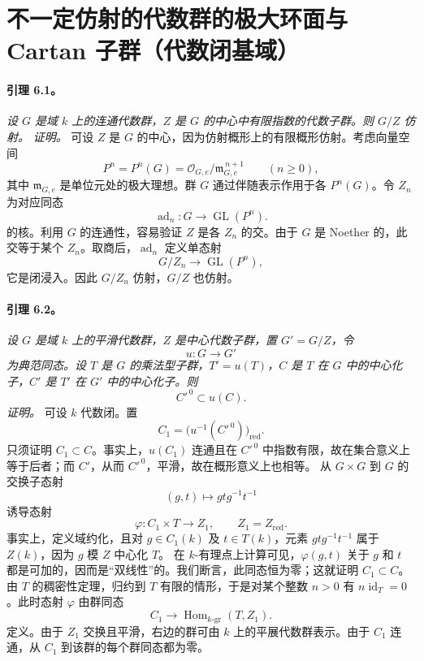 \section[极大环面与 Cartan 子群]
{不一定仿射的代数群的极大环面与 Cartan 子群\textup{（代数闭基域）}}
\paragraph{\textbf{引理 6.1。}}
\emph{设 \(G\) 是域 \(k\) 上的连通代数群，\(Z\) 是 \(G\) 的中心中有限指数的代数子群。则 \(G/Z\) 仿射。}
\emph{证明。}
可设 \(Z\) 是 \(G\) 的中心，因为仿射概形上的有限概形仿射。考虑向量空间
\[
  P^n=P^n(G)=
  \mathcal O_{G,e}/\mathfrak m_{G,e}^{\,n+1}
  \qquad (n\geq 0),
\]
其中 \(\mathfrak m_{G,e}\) 是单位元处的极大理想。群 \(G\) 通过伴随表示作用于各 \(P^n(G)\)。令 \(Z_n\) 为对应同态
\[
  \operatorname{ad}_n:G\longrightarrow \operatorname{GL}(P^n).
\]
的核。利用 \(G\) 的连通性，容易验证 \(Z\) 是各 \(Z_n\) 的交。由于 \(G\) 是 Noether 的，此交等于某个 \(Z_n\)。取商后，\(\operatorname{ad}_n\) 定义单态射
\[
  G/Z_n\longrightarrow \operatorname{GL}(P^n),
\]
它是闭浸入。因此 \(G/Z_n\) 仿射，\(G/Z\) 也仿射。
\paragraph{\textbf{引理 6.2。}}
\emph{设 \(G\) 是域 \(k\) 上的平滑代数群，\(Z\) 是中心代数子群，置 \(G'=G/Z\)，令
\[
  u:G\longrightarrow G'
\]
为典范同态。设 \(T\) 是 \(G\) 的乘法型子群，\(T'=u(T)\)，\(C\) 是 \(T\) 在 \(G\) 中的中心化子，\(C'\) 是 \(T'\) 在 \(G'\) 中的中心化子。则
\[
  C'^{\,0}\subset u(C).
\]
}
\emph{证明。}
可设 \(k\) 代数闭。置
\[
  C_1=\bigl(u^{-1}(C'^{\,0})\bigr)_{\mathrm{red}}.
\]
只须证明 \(C_1\subset C\)。事实上，\(u(C_1)\) 连通且在 \(C'^{\,0}\) 中指数有限，故在集合意义上等于后者；而 \(C'\)，从而 \(C'^{\,0}\)，平滑，故在概形意义上也相等。
从 \(G\times G\) 到 \(G\) 的交换子态射
\[
  (g,t)\longmapsto gtg^{-1}t^{-1}
\]
诱导态射
\[
  \varphi:C_1\times T\longrightarrow Z_1,
  \qquad Z_1=Z_{\mathrm{red}}.
\]
事实上，定义域约化，且对 \(g\in C_1(k)\) 及 \(t\in T(k)\)，元素 \(gtg^{-1}t^{-1}\) 属于 \(Z(k)\)，因为 \(g\) 模 \(Z\) 中心化 \(T\)。
在 \(k\)-有理点上计算可见，\(\varphi(g,t)\) 关于 \(g\) 和 \(t\) 都是可加的，因而是“双线性”的。我们断言，此同态恒为零；这就证明 \(C_1\subset C\)。由 \(T\) 的稠密性定理，归约到 \(T\) 有限的情形，于是对某个整数 \(n>0\) 有 \(n\operatorname{id}_T=0\)。此时态射 \(\varphi\) 由群同态
\[
  C_1\longrightarrow \operatorname{Hom}_{k\text{-gr}}(T,Z_1).
\]
定义。由于 \(Z_1\) 交换且平滑，右边的群可由 \(k\) 上的平展代数群表示。由于 \(C_1\) 连通，从 \(C_1\) 到该群的每个群同态都为零。
